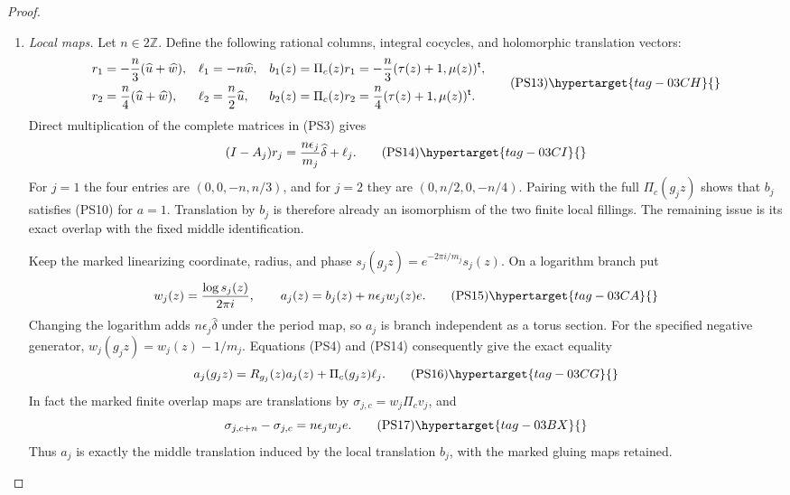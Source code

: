 \begin{proof}
\begin{enumerate}[label=\arabic*.,leftmargin=*]
\item \emph{Local maps.}
Let $n\in2\mathbb Z$. Define the following rational columns,
integral cocycles, and holomorphic translation vectors:
\[
\begin{aligned}
 r_1&=-\frac n3(\widehat u+\widehat w),&
 \ell_1&=-n\widehat w,&
 b_1(z)&=\Pi_c(z)r_1=-\frac n3(\tau(z)+1,\mu(z))^{\mathsf t},\\
 r_2&= \frac n4(\widehat u+\widehat w),&
 \ell_2&=\frac n2\widehat u,&
 b_2(z)&=\Pi_c(z)r_2=\frac n4(\tau(z)+1,\mu(z))^{\mathsf t}.
\end{aligned}
\tag{PS13}\hypertarget{tag-03CH}{}\label{wb:pshift:eq:local-corrections}
\]
Direct multiplication of the complete matrices in (PS3) gives
\[
 (I-A_j)r_j=\frac{n\epsilon_j}{m_j}\widehat\delta+\ell_j.
 \tag{PS14}\hypertarget{tag-03CI}{}\label{wb:pshift:eq:local-matrix-identity}
\]
For $j=1$ the four entries are $(0,0,-n,n/3)$, and for $j=2$
they are $(0,n/2,0,-n/4)$. Pairing with the full $\Pi_c(g_jz)$
shows that $b_j$ satisfies (PS10) for $a=1$.
Translation by $b_j$ is therefore already an isomorphism of the
two finite local fillings. The remaining issue is its exact overlap
with the fixed middle identification.

Keep the marked linearizing coordinate, radius, and phase
$s_j(g_jz)=e^{-2\pi i/m_j}s_j(z)$. On a logarithm branch put
\[
 w_j(z)=\frac{\log s_j(z)}{2\pi i},\qquad
 a_j(z)=b_j(z)+n\epsilon_j w_j(z)e.
 \tag{PS15}\hypertarget{tag-03CA}{}\label{wb:pshift:eq:finite-middle-sections}
\]
Changing the logarithm adds $n\epsilon_j\widehat\delta$ under the
period map, so $a_j$ is branch independent as a torus section.
For the specified negative generator, $w_j(g_jz)=w_j(z)-1/m_j$.
Equations (PS4) and (PS14) consequently give the exact equality
\[
 a_j(g_jz)=R_{g_j}(z)a_j(z)+\Pi_c(g_jz)\ell_j.
 \tag{PS16}\hypertarget{tag-03CG}{}\label{wb:pshift:eq:local-affine-cocycle}
\]
In fact the marked finite overlap maps are translations by
$\sigma_{j,c}=w_j\Pi_c v_j$, and
\[
                  \sigma_{j,c+n}-\sigma_{j,c}
                     =n\epsilon_jw_je.
 \tag{PS17}\hypertarget{tag-03BX}{}\label{wb:pshift:eq:actual-overlap-difference}
\]
Thus $a_j$ is exactly the middle translation induced by the local
translation $b_j$, with the marked gluing maps retained.


\end{enumerate}
\end{proof}
